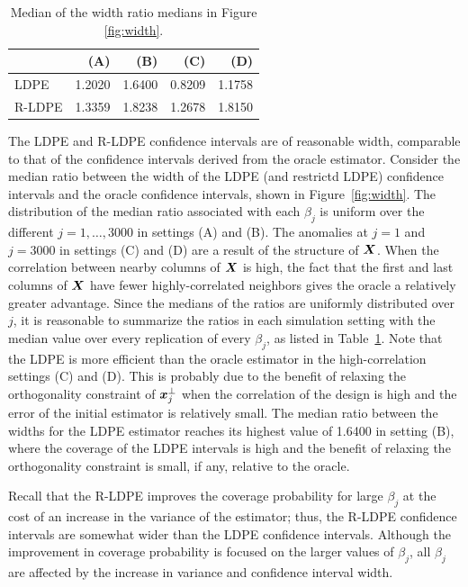 \documentclass[11pt]{amsart}
\begin{document}
\begin{table}[ht]
\begin{tabular}{lrrrr}
\toprule
& (A) & (B) & (C) & (D) \\
\midrule
LDPE & 1.2020 & 1.6400 & 0.8209 & 1.1758 \\
R-LDPE & 1.3359 & 1.8238 & 1.2678 & 1.8150 \\
\bottomrule
\end{tabular}
\caption{Median of the width ratio medians in Figure \ref{fig:width}.}
\label{tab:width}
\end{table}

The LDPE and R-LDPE confidence intervals are of reasonable width, 
comparable to that of the confidence intervals derived from the oracle estimator. 
Consider the median ratio between the width of the LDPE  (and restrictd LDPE) confidence intervals 
and the oracle confidence intervals, shown in Figure~\ref{fig:width}. 
The distribution of the median ratio associated with each $\beta_j$ is uniform 
over the different $j = 1, \ldots, 3000$ in settings (A) and (B). 
The anomalies at $j = 1$ and $j = 3000$ in settings (C) and (D) are a result of the structure of $\boldsymbol{X}$. 
When the correlation between nearby columns of $\boldsymbol{X}$ is high, the fact that the first and last columns of $\boldsymbol{X}$ 
have fewer highly-correlated neighbors gives the oracle {a} relatively {greater} advantage. 
Since the medians of the ratios are uniformly distributed over $j$, it is reasonable to summarize the ratios in each simulation setting with the median value over every replication of every $\beta_j$, as listed in Table~\ref{tab:width}. 
Note that the LDPE is more efficient than the oracle estimator in the high-correlation settings (C) and (D). 
This is probably due to the benefit of relaxing the orthogonality constraint of $\boldsymbol{x}^\perp_j$  
when the correlation of the design is high and the error of the initial estimator is relatively small. 
The median ratio between the widths for the LDPE estimator reaches its highest value of 1.6400 in setting (B), 
where the coverage of the LDPE intervals is high and the benefit of relaxing the orthogonality constraint is small, 
if any, relative to the oracle. 

Recall that the R-LDPE improves the coverage probability for large $\beta_j$ at the cost of an 
increase in the variance of the estimator; thus, the R-LDPE confidence intervals are somewhat
wider than the LDPE confidence intervals. Although the improvement in coverage probability is focused 
on the larger values of $\beta_j$, all $\beta_j$ are affected by the increase in variance and confidence interval width.
\end{document}

